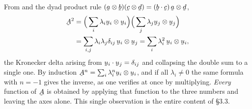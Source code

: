\begin{remark}\label{rem:powers}
From  and the dyad product rule
$(\ba\otimes\bb)(\bc\otimes\bd)=(\ip\bb\bc)\,\ba\otimes\bd$,
\[
\begin{aligned}
   \bA^{2}&=\Big(\sum_{i}\lambda_{i}\bu_{i}\otimes\bu_{i}\Big)
           \Big(\sum_{j}\lambda_{j}\bu_{j}\otimes\bu_{j}\Big)\\
          &=\sum_{i,j}\lambda_{i}\lambda_{j}\dd_{ij}\,\bu_{i}\otimes\bu_{j}
          =\sum_{i}\lambda_{i}^{2}\,\bu_{i}\otimes\bu_{i},
\end{aligned}
\]
the Kronecker delta arising from $\ip{\bu_{i}}{\bu_{j}}=\dd_{ij}$ and
collapsing the double sum to a single one. By induction
$\bA^{n}=\sum_{i}\lambda_{i}^{n}\bu_{i}\otimes\bu_{i}$, and if all
$\lambda_{i}\neq0$ the same formula with $n=-1$ gives the inverse, as one
verifies at once by multiplying. \emph{Every} function of $\bA$ is obtained
by applying that function to the three numbers and leaving the axes alone.
This single observation is the entire content of \S3.3.
\end{remark}

